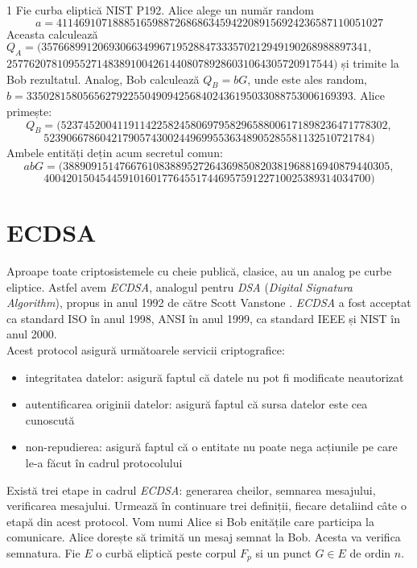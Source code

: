 \begin{ex}1
Fie curba eliptică NIST P192. Alice alege un număr random 
$$a= 4114691071888516598872686863459422089156924236587110051027$$
Aceasta calculează $Q_A = (3576689912069306634996719528847333570212949190268988897341,$ \\ $2577620781095527148389100426144080789286031064305720917544)$ și trimite la Bob rezultatul. Analog, Bob calculează $Q_B = bG$, unde este ales random, 
\\ $b = 3350281580565627922550490942568402436195033088753006169393$. Alice primește: 
$$Q_B = (5237452004119114225824580697958296588006171898236471778302,$$ $$5239066786042179057430024496995536348905285581132510721784)$$
Ambele entități dețin acum secretul comun:
$$abG = (3889091514766761083889527264369850820381968816940879440305, $$ $$4004201504544591016017764551744695759122710025389314034700)$$
\end{ex}

\section{ECDSA}

Aproape toate criptosistemele cu cheie publică, clasice, au un analog pe curbe eliptice. Astfel avem \textit{ECDSA}, analogul pentru \textit{DSA} (\textit{Digital Signatura Algorithm}), propus in anul 1992 de către Scott Vanstone \cite{ecdsa1}. \textit{ECDSA} a fost acceptat ca standard ISO în anul 1998, ANSI în anul 1999, ca standard IEEE și NIST în anul 2000. \\
Acest protocol asigură următoarele servicii criptografice:
\begin{itemize}
\item integritatea datelor: asigură faptul că datele nu pot fi modificate neautorizat
\item autentificarea originii datelor: asigură faptul că sursa datelor este cea cunoscută
\item non-repudierea: asigură faptul că o entitate nu poate nega acțiunile pe care le-a făcut în cadrul protocolului
\end{itemize}
Există trei etape in cadrul \textit{ECDSA}: generarea cheilor, semnarea mesajului, verificarea mesajului. Urmează în continuare trei definiții, fiecare detaliind câte o etapă din acest protocol. Vom numi Alice si Bob enitățile care participa la comunicare. Alice dorește să trimită un mesaj semnat la Bob. Acesta va verifica semnatura. Fie $E$ o curbă eliptică peste corpul $F_p$ si un punct $G\in E$ de ordin $n$.

